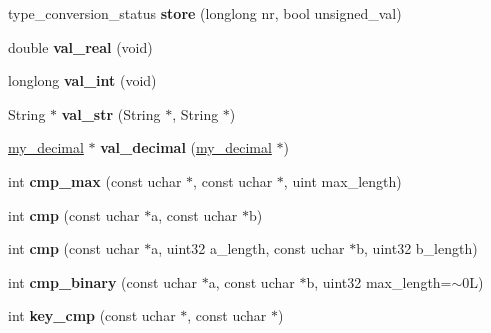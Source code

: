 \begin{DoxyCompactItemize}
\item 
\mbox{\label{classField__blob_a8298ba21e81a9a9c38af09b1b69286bf}} 
type\+\_\+conversion\+\_\+status {\bfseries store} (longlong nr, bool unsigned\+\_\+val)
\item 
\mbox{\label{classField__blob_a16d0d8f56d1ff49d05429e55ce56446e}} 
double {\bfseries val\+\_\+real} (void)
\item 
\mbox{\label{classField__blob_a179beb024f0553e87e42f10ea38e3347}} 
longlong {\bfseries val\+\_\+int} (void)
\item 
\mbox{\label{classField__blob_aa128b749dea163b482daa4746d389b71}} 
String $\ast$ {\bfseries val\+\_\+str} (String $\ast$, String $\ast$)
\item 
\mbox{\label{classField__blob_a96a3609da920352db5319605e861cd3a}} 
\mbox{\hyperlink{classmy__decimal}{my\+\_\+decimal}} $\ast$ {\bfseries val\+\_\+decimal} (\mbox{\hyperlink{classmy__decimal}{my\+\_\+decimal}} $\ast$)
\item 
\mbox{\label{classField__blob_ae396a387c5cb3da1b9969ed11b80a352}} 
int {\bfseries cmp\+\_\+max} (const uchar $\ast$, const uchar $\ast$, uint max\+\_\+length)
\item 
\mbox{\label{classField__blob_a352a5727ef3b31d4858135cf8c63ccd3}} 
int {\bfseries cmp} (const uchar $\ast$a, const uchar $\ast$b)
\item 
\mbox{\label{classField__blob_a25988deb0b39e1f205fd7b2d0c36494b}} 
int {\bfseries cmp} (const uchar $\ast$a, uint32 a\+\_\+length, const uchar $\ast$b, uint32 b\+\_\+length)
\item 
\mbox{\label{classField__blob_acdb6dc96b4c4547bf03cf93deef932c4}} 
int {\bfseries cmp\+\_\+binary} (const uchar $\ast$a, const uchar $\ast$b, uint32 max\+\_\+length=$\sim$0\+L)
\item 
\mbox{\label{classField__blob_a5559bb5dda195d1077346d8b46200f2f}} 
int {\bfseries key\+\_\+cmp} (const uchar $\ast$, const uchar $\ast$)

\end{DoxyCompactItemize}
